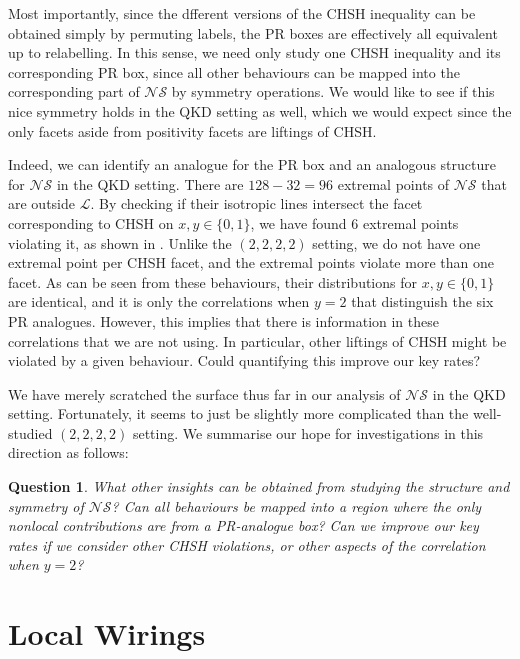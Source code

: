 \documentclass[10pt, a4paper]{article}
\numberwithin{equation}{section} %
\theoremstyle{definition}
\theoremstyle{plain}
\newtheorem{question}{Question}
\newcommand{\?}{\mathrel{?}} %
\newcommand{\Ls}{\mathcal{L}}
\newcommand{\NSs}{\mathcal{NS}}
\begin{document}
      Most importantly, since the dfferent versions of the CHSH inequality can be obtained simply by permuting labels, the PR boxes are effectively all equivalent up to relabelling. In this sense, we need only study one CHSH inequality and its corresponding PR box, since all other behaviours can be mapped into the corresponding part of \(\NSs\) by symmetry operations. We would like to see if this nice symmetry holds in the QKD setting as well, which we would expect since the only facets aside from positivity facets are liftings of CHSH.

      Indeed, we can identify an analogue for the PR box and an analogous structure for \(\NSs\) in the QKD setting. There are \(128 - 32 = 96\) extremal points of \(\NSs\) that are outside \(\Ls\). By checking if their isotropic lines intersect the facet corresponding to CHSH on \(x, y \in \{0,1\}\), we have found 6 extremal points violating it, as shown in . Unlike the \((2,2,2,2)\) setting, we do not have one extremal point per CHSH facet, and the extremal points violate more than one facet. As can be seen from these behaviours, their distributions for \(x, y \in \{0,1\}\) are identical, and it is only the correlations when \(y = 2\) that distinguish the six PR analogues. However, this implies that there is information in these correlations that we are not using. In particular, other liftings of CHSH might be violated by a given behaviour. Could quantifying this improve our key rates?

      We have merely scratched the surface thus far in our analysis of \(\NSs\) in the QKD setting. Fortunately, it seems to just be slightly more complicated than the well-studied \((2,2,2,2)\) setting. We summarise our hope for investigations in this direction as follows:
      \begin{question}
        What other insights can be obtained from studying the structure and symmetry of \(\NSs\)? Can all behaviours be mapped into a region where the only nonlocal contributions are from a PR-analogue box? Can we improve our key rates if we consider other CHSH violations, or other aspects of the correlation when \(y=2\)?
      \end{question}

      \section{Local Wirings}\label{sec:locwir}
\end{document}
